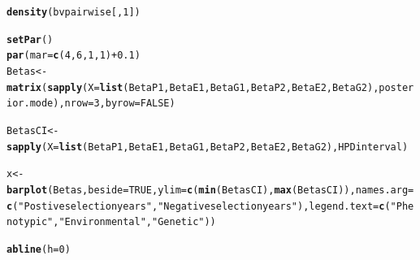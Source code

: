 \documentclass{article}\usepackage[]{graphicx}\usepackage[]{color}
\makeatletter
\newcommand{\hlnum}[1]{\textcolor[rgb]{0.686,0.059,0.569}{#1}}%
\newcommand{\hlstr}[1]{\textcolor[rgb]{0.192,0.494,0.8}{#1}}%
\newcommand{\hlopt}[1]{\textcolor[rgb]{0,0,0}{#1}}%
\newcommand{\hlstd}[1]{\textcolor[rgb]{0.345,0.345,0.345}{#1}}%
\newcommand{\hlkwb}[1]{\textcolor[rgb]{0.69,0.353,0.396}{#1}}%
\newcommand{\hlkwc}[1]{\textcolor[rgb]{0.333,0.667,0.333}{#1}}%
\newcommand{\hlkwd}[1]{\textcolor[rgb]{0.737,0.353,0.396}{\textbf{#1}}}%
\newenvironment{kframe}{%
 \def\at@end@of@kframe{}%
 \ifinner\ifhmode%
  \def\at@end@of@kframe{\end{minipage}}%
  \begin{minipage}{\columnwidth}%
 \fi\fi%
 \def\FrameCommand##1{\hskip\@totalleftmargin \hskip-\fboxsep
 \colorbox{shadecolor}{##1}\hskip-\fboxsep
     \hskip-\linewidth \hskip-\@totalleftmargin \hskip\columnwidth}%
 \MakeFramed {\advance\hsize-\width
   \@totalleftmargin\z@ \linewidth\hsize
   \@setminipage}}%
 {\par\unskip\endMakeFramed%
 \at@end@of@kframe}
\newenvironment{knitrout}{}{} %
\makeatother
\begin{document}
\begin{knitrout}
\begin{kframe}
{\ttfamily\noindent\bfseries\color{errorcolor}{\#\# Error in int\_abline(a = a, b = b, h = h, v = v, untf = untf, ...): plot.new has not been called yet}}\begin{alltt}
\hlkwd{density}\hlstd{(bvpairwise[,}\hlnum{1}\hlstd{])}
\end{alltt}


{\ttfamily\noindent\bfseries\color{errorcolor}{\#\# Error in density(bvpairwise[, 1]): object 'bvpairwise' not found}}\end{kframe}
\end{knitrout}

\begin{knitrout}
\color{fgcolor}\begin{kframe}
\begin{alltt}
\hlkwd{setPar}\hlstd{()}
\hlkwd{par}\hlstd{(}\hlkwc{mar}\hlstd{=}\hlkwd{c}\hlstd{(}\hlnum{4}\hlstd{,} \hlnum{6}\hlstd{,} \hlnum{1}\hlstd{,} \hlnum{1}\hlstd{)} \hlopt{+} \hlnum{0.1}\hlstd{)}
\hlstd{Betas} \hlkwb{<-} \hlkwd{matrix}\hlstd{(}\hlkwd{sapply}\hlstd{(}\hlkwc{X} \hlstd{=} \hlkwd{list}\hlstd{(BetaP1, BetaE1, BetaG1, BetaP2, BetaE2, BetaG2), posterior.mode),}\hlkwc{nrow} \hlstd{=}\hlnum{3}\hlstd{,} \hlkwc{byrow}\hlstd{=}\hlnum{FALSE}\hlstd{)}
\end{alltt}


{\ttfamily\noindent\bfseries\color{errorcolor}{\#\# Error in match.fun(FUN): object 'posterior.mode' not found}}\begin{alltt}
\hlstd{BetasCI} \hlkwb{<-} \hlkwd{sapply}\hlstd{(}\hlkwc{X} \hlstd{=} \hlkwd{list}\hlstd{(BetaP1, BetaE1, BetaG1, BetaP2, BetaE2, BetaG2), HPDinterval)}
\end{alltt}


{\ttfamily\noindent\bfseries\color{errorcolor}{\#\# Error in match.fun(FUN): object 'HPDinterval' not found}}\begin{alltt}
\hlstd{x} \hlkwb{<-} \hlkwd{barplot}\hlstd{(Betas,} \hlkwc{beside}\hlstd{=}\hlnum{TRUE}\hlstd{,} \hlkwc{ylim}\hlstd{=}\hlkwd{c}\hlstd{(}\hlkwd{min}\hlstd{(BetasCI),}\hlkwd{max}\hlstd{(BetasCI)),}\hlkwc{names.arg} \hlstd{=} \hlkwd{c}\hlstd{(}\hlstr{"Postive selection years"}\hlstd{,}\hlstr{"Negative selection years"}\hlstd{),} \hlkwc{legend.text} \hlstd{=} \hlkwd{c}\hlstd{(}\hlstr{"Phenotypic"}\hlstd{,}\hlstr{"Environmental"}\hlstd{,}\hlstr{"Genetic"}\hlstd{))}
\end{alltt}


{\ttfamily\noindent\bfseries\color{errorcolor}{\#\# Error in barplot(Betas, beside = TRUE, ylim = c(min(BetasCI), max(BetasCI)), : object 'Betas' not found}}\begin{alltt}
\hlkwd{abline}\hlstd{(}\hlkwc{h}\hlstd{=}\hlnum{0}\hlstd{)}
\end{alltt}



\end{kframe}
\end{knitrout}
\end{document}
